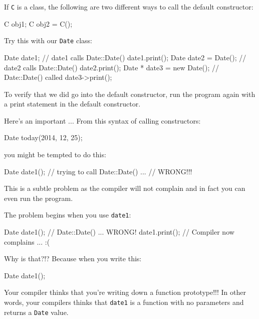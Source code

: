 If \texttt{C} is a class, the following are two different ways to call the
default constructor:

\begin{consolethree}[escapeinside=||]
C obj1;
C obj2 = C();
\end{consolethree}

Try this with our \texttt{Date} class:

\begin{consolethree}[escapeinside=||]
Date date1;            // date1 calls Date::Date()
date1.print();
Date date2 = Date();   // date2 calls Date::Date()
date2.print();
Date * date3 = new Date(); // Date::Date() called
date3->print();
\end{consolethree}

To verify that we did go into the default constructor, run the program
again with a print statement in the default constructor.

Here's an important  ... From this
syntax of calling constructors:

\begin{consolethree}[escapeinside=||]
Date today(2014, 12, 25);
\end{consolethree}

you might be tempted to do this:

\begin{consolethree}[escapeinside=||]
Date date1();  // trying to call Date::Date() ...
               // WRONG!!!
\end{consolethree}

This is a subtle problem as the compiler will not complain and in fact
you can even run the program.

The problem begins when you use \texttt{date1}:

\begin{consolethree}[escapeinside=||]
Date date1();  // Date::Date() ... WRONG!
date1.print(); // Compiler now complains ... :(
\end{consolethree}

Why is that?!? Because when you write this:

\begin{consolethree}[escapeinside=||]
Date date1();
\end{consolethree}

Your compiler thinks that you're writing down a function
prototype!!! In other words, your compilers thinks that \texttt{date1} is
a function with no parameters and returns a \texttt{Date} value.

